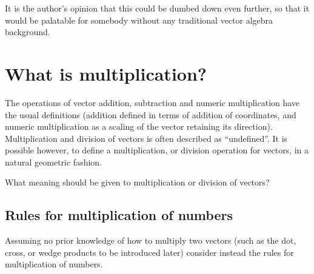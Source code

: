 \documentclass{article}      %
\begin{document}
It is the author's opinion that this could be dumbed down even further, so that it would be palatable for
somebody without any traditional vector algebra background.

\section{What is multiplication?}

The operations of vector addition, subtraction and numeric multiplication have the usual definitions
(addition defined in terms of addition of coordinates, and numeric multiplication as a scaling of the vector retaining its direction).  Multiplication and division of vectors is often described as ``undefined''.  It is possible however, to define a multiplication, or division operation for vectors, in a natural geometric fashion.

What meaning should be given to multiplication or division of vectors?

\subsection{Rules for multiplication of numbers}

Assuming no prior knowledge of how to multiply two vectors (such as the dot, cross, or wedge products to be introduced later) consider instead the rules for multiplication of numbers.
\end{document}
